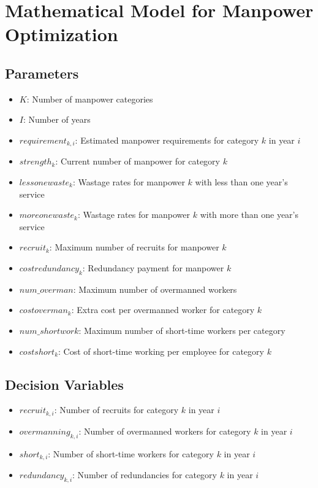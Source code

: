 \documentclass{article}
\begin{document}
\section*{Mathematical Model for Manpower Optimization}

\subsection*{Parameters}
\begin{itemize}
    \item $K$: Number of manpower categories
    \item $I$: Number of years
    \item $requirement_{k,i}$: Estimated manpower requirements for category $k$ in year $i$
    \item $strength_{k}$: Current number of manpower for category $k$
    \item $lessonewaste_{k}$: Wastage rates for manpower $k$ with less than one year's service
    \item $moreonewaste_{k}$: Wastage rates for manpower $k$ with more than one year's service
    \item $recruit_{k}$: Maximum number of recruits for manpower $k$
    \item $costredundancy_{k}$: Redundancy payment for manpower $k$
    \item $num\_overman$: Maximum number of overmanned workers
    \item $costoverman_{k}$: Extra cost per overmanned worker for category $k$
    \item $num\_shortwork$: Maximum number of short-time workers per category
    \item $costshort_{k}$: Cost of short-time working per employee for category $k$
\end{itemize}

\subsection*{Decision Variables}
\begin{itemize}
    \item $recruit_{k,i}$: Number of recruits for category $k$ in year $i$
    \item $overmanning_{k,i}$: Number of overmanned workers for category $k$ in year $i$
    \item $short_{k,i}$: Number of short-time workers for category $k$ in year $i$
    \item $redundancy_{k,i}$: Number of redundancies for category $k$ in year $i$
\end{itemize}
\end{document}
